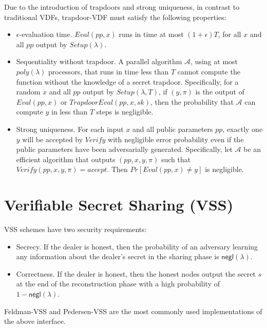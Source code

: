 \documentclass[letterpaper,twocolumn,10pt]{article}
\theoremstyle{definition}
\theoremstyle{remark}
\begin{document}
Due to the introduction of trapdoors and strong uniqueness, in contrast to traditional VDFs, trapdoor-VDF must satisfy the following properties:

\begin{itemize}
    \item $\epsilon$-evaluation time. $Eval(pp, x)$ runs in time at most $(1 + \epsilon) T$, for all $x$ and all $pp$ output by $Setup(\lambda)$.
    \item Sequentiality without trapdoor. A parallel algorithm $\mathcal{A}$, using at most $poly(\lambda)$ processors, that runs in time less than $T$ cannot compute the function without the knowledge of a secret trapdoor. Specifically, for a random $x$ and all $pp$ output by $Setup(\lambda, T)$, if $(y, \pi)$ is the output of $Eval(pp, x)$ or $TrapdoorEval(pp,x,sk)$, then the probability that $\mathcal{A}$ can compute $y$ in less than $T$ steps is negligible.
    \item Strong uniqueness. For each input $x$ and all public parameters $pp$, exactly one $y$ will be accepted by $Verify$ with negligible error probability even if the public parameters have been adversarially generated. Specifically, let $\mathcal{A}$ be an efficient algorithm that outputs $(pp, x, y, \pi)$ such that $Verify(pp, x, y, \pi) = accept$. Then $Pr[Eval(pp, x) \neq y]$ is negligible.
\end{itemize}

\section{Verifiable Secret Sharing (VSS)}
\label{appendix:vss}
VSS schemes have two security requirements:
\begin{itemize}
    \item Secrecy. If the dealer is honest, then the probability of an adversary learning
    any information about the dealer’s secret in the sharing phase is $\mathsf{negl}(\lambda)$.
    \item Correctness. If the dealer is honest, then the honest nodes output the secret
    $s$ at the end of the reconstruction phase with a high probability of $1 - \mathsf{negl}(\lambda)$.
\end{itemize}
Feldman-VSS \cite{feldman1987practical} and Pedersen-VSS \cite{pedersen1991non} are the most commonly used implementations of the above interface.
\end{document}
